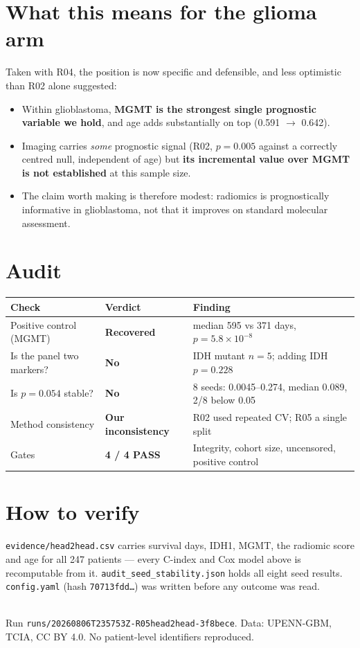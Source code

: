 \documentclass[11pt,a4paper]{article}
\begin{document}
\section{What this means for the glioma arm}

Taken with R04, the position is now specific and defensible, and less optimistic than R02
alone suggested:

\begin{itemize}[leftmargin=1.4em,nosep]
\item Within glioblastoma, \textbf{MGMT is the strongest single prognostic variable we hold},
and age adds substantially on top (0.591 $\to$ 0.642).
\item Imaging carries \emph{some} prognostic signal (R02, $p=0.005$ against a correctly
centred null, independent of age) but \textbf{its incremental value over MGMT is not
established} at this sample size.
\item The claim worth making is therefore modest: radiomics is prognostically informative in
glioblastoma, not that it improves on standard molecular assessment.
\end{itemize}

\section{Audit}

\begin{center}
\begin{tabular}{@{}llp{7.0cm}@{}}
\toprule
\textbf{Check} & \textbf{Verdict} & \textbf{Finding} \\
\midrule
Positive control (MGMT) & \textbf{Recovered} & median 595 vs 371 days, $p=5.8\times10^{-8}$ \\
Is the panel two markers? & \textbf{No} & IDH mutant $n=5$; adding IDH $p=0.228$ \\
Is $p=0.054$ stable? & \textbf{No} & 8 seeds: 0.0045--0.274, median 0.089, 2/8 below 0.05 \\
Method consistency & \textbf{Our inconsistency} & R02 used repeated CV; R05 a single split \\
Gates & \textbf{4 / 4 PASS} & Integrity, cohort size, uncensored, positive control \\
\bottomrule
\end{tabular}
\end{center}

\section{How to verify}

\texttt{evidence/head2head.csv} carries survival days, IDH1, MGMT, the radiomic score and age
for all 247 patients --- every C-index and Cox model above is recomputable from it.
\texttt{audit\_seed\_stability.json} holds all eight seed results.
\texttt{config.yaml} (hash \texttt{70713fdd\ldots}) was written before any outcome was read.

\vfill
\noindent{\color{qgrey}\rule{\textwidth}{0.4pt}}\\
{\footnotesize\color{qgrey}Run \texttt{runs/20260806T235753Z-R05head2head-3f8bece}. Data:
UPENN-GBM, TCIA, CC BY 4.0. No patient-level identifiers reproduced.}
\end{document}
